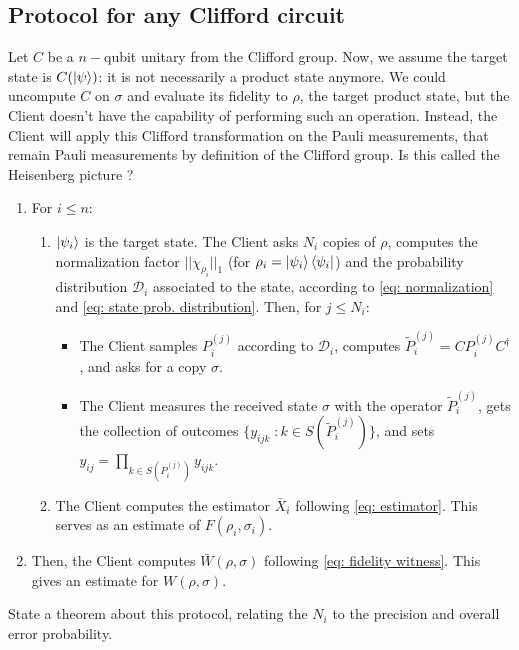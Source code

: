\documentclass[a4paper,unpublished,onecolumn,11pt]{quantumarticle}
\begin{document}
\subsection{Protocol for any Clifford circuit}
Let $C$ be a $n-$qubit unitary from the Clifford group. Now, we assume the target state is $C(\ket \psi)$: it is not necessarily a product state anymore. We could uncompute $C$ on $\sigma$ and evaluate its fidelity to $\rho$, the target product state, but the Client doesn't have the capability of performing such an operation. Instead, the Client will apply this Clifford transformation on the Pauli measurements, that remain Pauli measurements by definition of the Clifford group. Is this called the Heisenberg picture ?
\begin{enumerate}
    \item For $i\leq n$:
        \begin{enumerate}
            \item $\ket{\psi_i}$ is the target state. The Client asks $N_i$ copies of $\rho$,  computes the normalization factor $||\chi_{\rho_i}||_1$ (for $\rho_i = \ket{\psi_i}\bra{\psi_i}$) and the probability distribution $\mathcal D_i$ associated to the state, according to \ref{eq: normalization} and \ref{eq: state prob. distribution}. Then, for $j\leq N_i$:
            \begin{itemize}
                \item The Client samples $P_{i}^{(j)}$ according to $\mathcal D_i$, computes $\tilde P_i^{(j)} = C P_{i}^{(j)} C^\dagger$, and asks for a copy $\sigma$.
                \item The Client measures the received state $\sigma$ with the operator $\tilde P_i^{(j)}$, gets the collection of outcomes $\{y_{ijk}\; : k\in S(\tilde P_i^{(j)})\}$, and sets $y_{ij} = \prod_{k\in S(P_i^{(j)})} y_{ijk}$.
            \end{itemize}
            \item The Client computes the estimator $\bar X_i$ following \ref{eq: estimator}. This serves as an estimate of $F(\rho_i, \sigma_i)$.
        \end{enumerate}
    \item Then, the Client computes $\bar W(\rho, \sigma)$ following \ref{eq: fidelity witness}. This gives an estimate for $W(\rho, \sigma)$.
\end{enumerate}
State a theorem about this protocol, relating the $N_i$ to the precision and overall error probability.
\end{document}
